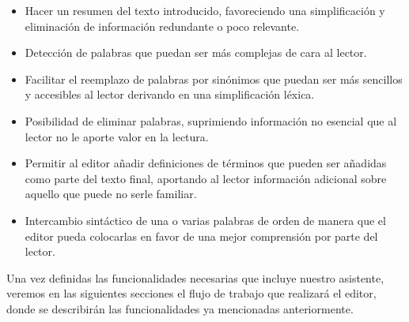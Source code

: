 \begin{itemize}
	
	\item Hacer un resumen del texto introducido, favoreciendo una simplificación y eliminación de información redundante o poco relevante.
	\item  Detección de palabras que puedan ser más complejas de cara al lector.
	\item Facilitar el reemplazo de palabras por sinónimos que puedan ser más sencillos y accesibles al lector derivando en una simplificación léxica.
	\item Posibilidad de eliminar palabras, suprimiendo información no esencial que al lector no le aporte valor en la lectura.
	\item Permitir al editor añadir definiciones de términos que pueden ser añadidas como parte del texto final, aportando al lector información adicional sobre aquello que puede no serle familiar.
	\item  Intercambio sintáctico de una o varias palabras de orden de manera que el editor pueda colocarlas en favor de una mejor comprensión por parte del lector.
\end{itemize}

 

Una vez definidas las funcionalidades necesarias que incluye nuestro asistente, veremos en las siguientes secciones el flujo de trabajo que realizará el editor, donde se describirán las funcionalidades ya mencionadas anteriormente.





